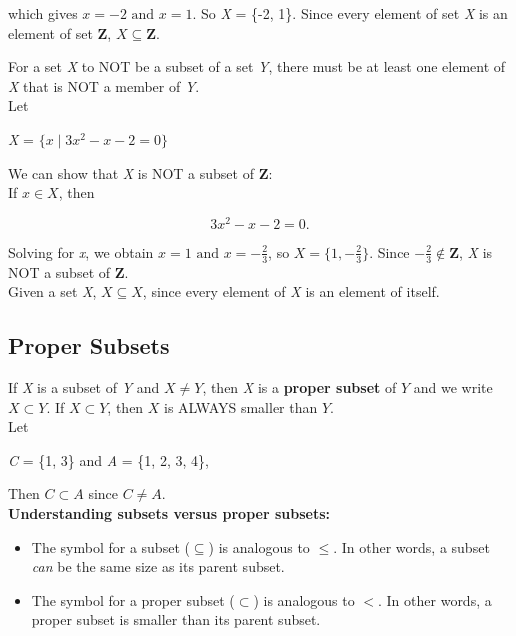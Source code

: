 which gives $x = -2 \text{ and } x = 1$. So \textit{X} = \{-2, 1\}.  Since every element of set \textit{X} is an element of set \textbf{Z}, $X \subseteq \textbf{Z}$.

\clearpage

For a set \textit{X} to NOT be a subset of a set \textit{Y}, there must be at least one element of \textit{X} that is NOT a member of \textit{Y}.\\

Let

\begin{center}
\textit{X} = $\{x \mid 3x^2 - x - 2 = 0 \}$
\end{center}

We can show that \textit{X} is NOT a subset of \textbf{Z}:\\

If $x \in X$, then

\[
    3x^2 - x - 2 = 0.
\]

Solving for \textit{x}, we obtain $x = 1 \text{ and } x = -\frac{2}{3}$, so $X = \{1, -\frac{2}{3}\}$.  Since $-\frac{2}{3} \not\in \textbf{Z}$, \textit{X} is NOT a subset of \textbf{Z}.\\

Given a set \textit{X}, $X \subseteq X$, since every element of \textit{X} is an element of itself.\\

\subsection*{Proper Subsets}

If \textit{X} is a subset of \textit{Y} and $X \neq Y$, then \textit{X} is a \textbf{proper subset} of $Y$ and we write $X \subset Y$.  If $X \subset Y$, then $X$ is ALWAYS smaller than $Y$.\\

Let

\begin{center}
\textit{C} = \{1, 3\} and \textit{A} = \{1, 2, 3, 4\},
\end{center}

Then $C \subset A$ since $C \neq A$.\\


\textbf{Understanding subsets versus proper subsets:}

\begin{itemize}
\item The symbol for a subset ($\subseteq$) is analogous to $\leq$.  In other words, a subset \textit{can} be the same size as its parent subset.
\item The symbol for a proper subset ($\subset$) is analogous to $<$.  In other words, a proper subset is smaller than its parent subset.
\end{itemize}

